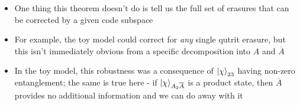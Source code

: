 \documentclass[12pt,a4paper]{article}
\numberwithin{equation}{section}
\newcommand{\Hcode}{\mathcal{H}_{\text{code}}}
\begin{document}
\begin{itemize}
\begin{proof}
\begin{itemize}
				\begin{equation}
					\begin{aligned}
						\frac{1}{\sqrt{|R|}}\sum_{i}\ket{i}_{R}\ket{i_{L}}_{A\overline{A}}&=U_{A}\left(\frac{1}{\sqrt{|R|}}\sum_{i}\ket{i}_{R}\ket{i}_{A_{1}}\otimes\ket{\chi}_{A_{2}\overline{A}}\right)\\
						\implies \ket{i_{L}}_{A\overline{A}}&=U_{A}\left(\ket{i}_{A_{1}}\otimes\ket{\chi}_{A_{2}\overline{A}}\right)
					\end{aligned}
				\end{equation}
				\item $(4)\implies(1)$: Just define $O_{A}\equiv U_{A}O_{A_{1}}U_{A}^{\dagger}$, where $O_{A_{1}}$ is an operator on $\mathcal{H}_{A_{1}}$ with the same matrix elements as $O_{L}$ does on $\Hcode$. $\blacksquare$
			\end{itemize}
		\end{proof}
		\item One thing this theorem doesn't do is tell us the full set of erasures that can be corrected by a given code subspace
		\item For example, the toy model could correct for \textit{any} single qutrit erasure, but this isn't immediately obvious from a specific decomposition into $A$ and $\overline{A}$
		\item In the toy model, this robustness was a consequence of $\ket{\chi}_{23}$ having non-zero entanglement; the same is true here - if $\ket{\chi}_{A_{2}\overline{A}}$ is a product state, then $\overline{A}$ provides no additional information and we can do away with it
	\end{itemize}
\end{document}
